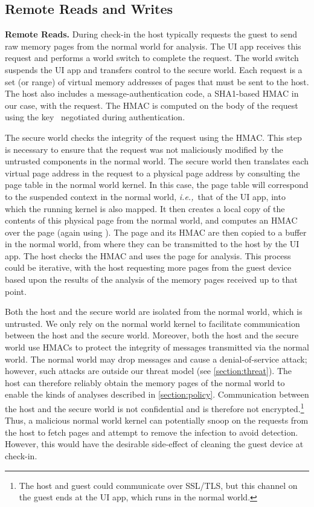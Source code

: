 \documentclass[pageno]{sig-alternate-05-2015}
\newcommand{\sectref}[1]{\autoref{#1}}
\newcommand{\myparagraph}[1]{\indent\par\noindent\textsf{\textbf{#1.}}}
\newcommand{\ie}{\textit{i.e.,}}
\begin{document}
\subsection{Remote Reads and Writes}
\label{section:mechanism:rmo}

\myparagraph{Remote Reads} 
%
During check-in the host typically requests the guest to send raw memory pages
from the normal world for analysis.  The UI app receives this request and
performs a world switch to complete the request.  The world switch suspends the
UI app and transfers control to the secure world.  Each request is a set (or
range) of virtual memory addresses of pages that must be sent to the host.  The
host also includes a message-authentication code, a SHA1-based HMAC in our
case, with the request. The HMAC is computed on the body of the request using
the key \ks\ negotiated during authentication.

The secure world checks the integrity of the request using the HMAC. This step
is necessary to ensure that the request was not maliciously modified by the
untrusted components in the normal world. The secure world then translates each
virtual page address in the request to a physical page address by consulting
the page table in the normal world kernel. In this case, the page table will
correspond to the suspended context in the normal world, \ie~that of the UI
app, into which the running kernel is also mapped.  It then creates a local
copy of the contents of this physical page from the normal world, and computes
an HMAC over the page (again using \ks). The page and its HMAC are then copied
to a buffer in the normal world, from where they can be transmitted to the host
by the UI app.  The host checks the HMAC and uses the page for analysis. This
process could be iterative, with the host requesting more pages from the guest
device based upon the results of the analysis of the memory pages received up
to that point.

Both the host and the secure world are isolated from the normal world, which is
untrusted. We only rely on the normal world kernel to facilitate communication
between the host and the secure world. Moreover, both the host and the secure
world use HMACs to protect the integrity of messages transmitted via the normal
world.  The normal world may drop messages and cause a denial-of-service
attack; however, such attacks are outside our threat model (see
\sectref{section:threat}). The host can therefore reliably obtain the memory
pages of the normal world to enable the kinds of analyses described in
\sectref{section:policy}. Communication between the host and the secure world
is not confidential and is therefore not encrypted.\footnote{The host and guest
could communicate over SSL/TLS, but this channel on the guest ends at the UI
app, which runs in the normal world.} Thus, a malicious normal world kernel can
potentially snoop on the requests from the host to fetch pages and attempt to
remove the infection to avoid detection. However, this would have the desirable
side-effect of cleaning the guest device at check-in.
\end{document}
